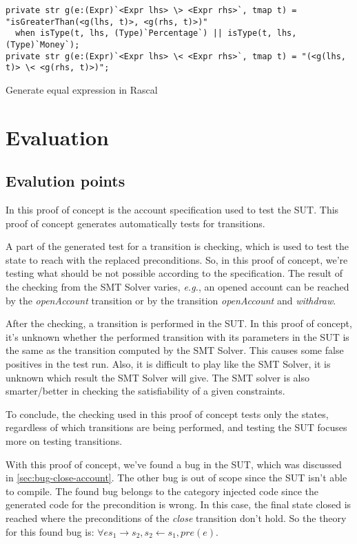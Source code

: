 \begin{sourcecode}[h!]
\begin{lstlisting}[]
private str g(e:(Expr)`<Expr lhs> \> <Expr rhs>`, tmap t) = "isGreaterThan(<g(lhs, t)>, <g(rhs, t)>)"
  when isType(t, lhs, (Type)`Percentage`) || isType(t, lhs, (Type)`Money`);
private str g(e:(Expr)`<Expr lhs> \< <Expr rhs>`, tmap t) = "(<g(lhs, t)> \< <g(rhs, t)>)";
\end{lstlisting}
\caption{Generate equal expression in Rascal}\label{fig:rascal-datomic-synthesize-lessthan}
\end{sourcecode}

\section{Evaluation}\label{sec:ch4-evaluation}

\subsection{Evalution points}
In this proof of concept is the account specification used to test the SUT.
This proof of concept generates automatically tests for transitions.

A part of
the generated test for a transition is checking, which is used to test the state to
reach with the replaced preconditions. So, in this proof of concept, we're
testing what should be not possible according to the specification. The result
of the checking from the SMT Solver varies, \textit{e.g.}, an opened account can be
reached by the \textit{openAccount} transition or by the transition
\textit{openAccount} and \textit{withdraw}.

After the checking, a transition
is performed in the SUT. In this proof of concept, it's unknown whether the
performed transition with its parameters in the SUT is the same as the
transition computed by the SMT Solver. This causes some false positives in the
test run. Also, it is difficult to play like the SMT Solver, it is unknown which
result the SMT Solver will give. The SMT solver is also smarter/better in checking
the satisfiability of a given constraints.

To conclude, the checking used in this proof of concept tests only the states, regardless of which transitions are
being performed, and testing the SUT focuses more on testing transitions.

With this proof of concept, we've found a bug in the SUT, which was
discussed in \autoref{sec:bug-close-account}. The other bug is out of scope
since the SUT isn't able to compile. The found bug belongs to the category
injected code since the generated code for the precondition is wrong. In this
case, the final state closed is reached where the preconditions of the \textit{close}
transition don't hold. So the theory for this found bug is:
$\forall e s_{1} \to s_{2}, s_{2} \gets s_{1}, pre(e)$.

